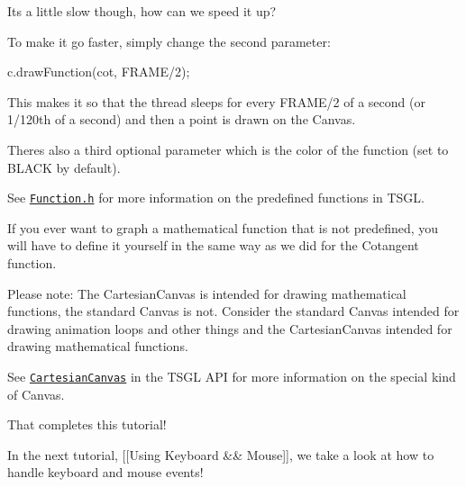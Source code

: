 It\textquotesingle{}s a little slow though, how can we speed it up?

To make it go faster, simply change the second parameter\+:


\begin{DoxyCode}
c.drawFunction(cot, FRAME/2);
\end{DoxyCode}


This makes it so that the thread sleeps for every F\+R\+A\+M\+E/2 of a second (or 1/120th of a second) and then a point is drawn on the Canvas.

There\textquotesingle{}s also a third optional parameter which is the color of the function (set to B\+L\+A\+C\+K by default).

See \href{http://calvin-cs.github.io/TSGL/html/classtsgl_1_1_function.html}{\tt Function.\+h} for more information on the predefined functions in T\+S\+G\+L.

If you ever want to graph a mathematical function that is not predefined, you will have to define it yourself in the same way as we did for the Cotangent function.

Please note\+: The Cartesian\+Canvas is intended for drawing mathematical functions, the standard Canvas is not. Consider the standard Canvas intended for drawing animation loops and other things and the Cartesian\+Canvas intended for drawing mathematical functions.

See \href{http://calvin-cs.github.io/TSGL/html/classtsgl_1_1_cartesian_canvas.html}{\tt Cartesian\+Canvas} in the T\+S\+G\+L A\+P\+I for more information on the special kind of Canvas.

That completes this tutorial!

In the next tutorial, \mbox{[}\mbox{[}Using Keyboard \&\& Mouse\mbox{]}\mbox{]}, we take a look at how to handle keyboard and mouse events! 